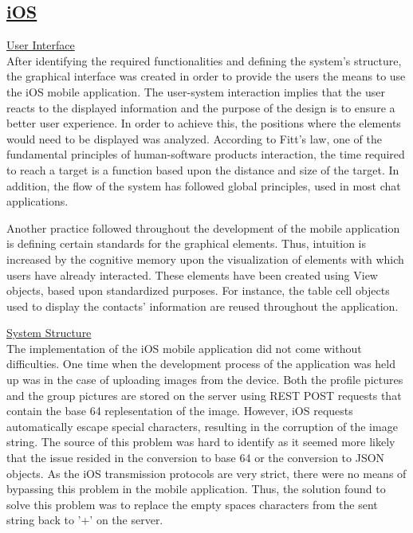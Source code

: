\documentclass{article}
\begin{document}
\begin{enumerate}
	\subsection{\underline{\textbf{iOS}}}
	
	
	\underline{User Interface}\\
	After identifying the required functionalities and defining the system's structure, the graphical interface was created in order to provide the users the means to use the iOS mobile application. The user-system interaction implies that the user reacts to the displayed information and the purpose of the design is to ensure a better user experience. In order to achieve this, the positions where the elements would need to be displayed was analyzed. According to Fitt's law, one of the fundamental principles of human-software products interaction, the time required to reach a target is a function based upon the distance and size of the target. In addition, the flow of the system has followed global principles, used in most chat applications.\par
	
	Another practice followed throughout the development of the mobile application is defining certain standards for the graphical elements. Thus, intuition is increased by the cognitive memory upon the visualization of elements with which users have already interacted. These elements have been created using View objects, based upon standardized purposes. For instance, the table cell objects used to display the contacts' information are reused throughout the application.\par
	
	\underline{System Structure}\\
	The implementation of the iOS mobile application did not come without difficulties. One time when the development process of the application was held up was in the case of uploading images from the device. Both the profile pictures and the group pictures are stored on the server using REST POST requests that contain the base 64 replesentation of the image. However, iOS requests automatically escape special characters, resulting in the corruption of the image string. The source of this problem was hard to identify as it seemed more likely that the issue resided in the conversion to base 64 or the conversion to JSON objects. As the iOS transmission protocols are very strict, there were no means of bypassing this problem in the mobile application. Thus, the solution found to solve this problem was to replace the empty spaces characters from the sent string back to '+' on the server.\par
	

\end{enumerate}
\end{document}

